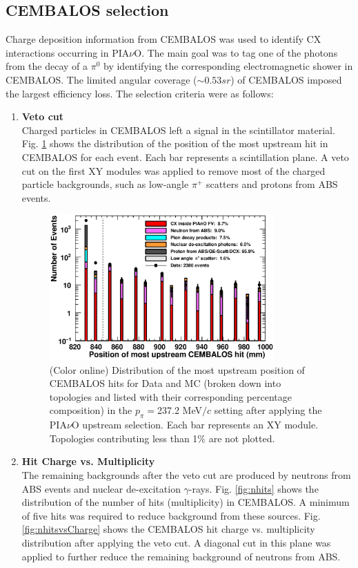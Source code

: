 \subsection{CEMBALOS selection}
Charge deposition information from CEMBALOS was used to identify CX interactions occurring in PIA$\nu$O. The main goal was to tag one of the photons from the decay of a $\pi^0$ by identifying the corresponding electromagnetic shower in CEMBALOS. The limited angular coverage ($\sim0.53 sr$) of CEMBALOS imposed the largest efficiency loss. The selection criteria were as follows:
\begin{enumerate}
\item{\bf Veto cut\\}
Charged particles in CEMBALOS left a signal in the scintillator material. Fig. \ref{fig:veto} shows the distribution of the position of the most upstream hit in CEMBALOS for each event. Each bar represents a scintillation plane. A veto cut on the first XY modules was applied to remove most of the charged particle backgrounds, such as low-angle $\pi^+$ scatters and protons from ABS events.

\begin{figure}[ht]
 \includegraphics[width=86mm]{figures/duettag_fgdMostUp_10000_forpaper_v4.eps}
 \caption{(Color online) Distribution of the most upstream position of CEMBALOS hits for Data and MC (broken down into topologies and listed with their corresponding percentage composition) in the $p_\pi=$237.2 MeV$/c$ setting after applying the PIA$\nu$O upstream selection. Each bar represents an XY module. Topologies contributing less than 1\% are not plotted.}
 \label{fig:veto}
\end{figure}
   
\item{\bf Hit Charge vs. Multiplicity\\}
The remaining backgrounds after the veto cut are produced by neutrons from ABS events and nuclear de-excitation $\gamma$-rays. Fig. \ref{fig:nhits} shows the distribution of the number of hits (multiplicity) in CEMBALOS. A minimum of five hits was required to reduce background from these sources. Fig. \ref{fig:nhitsvsCharge} shows the CEMBALOS hit charge vs. multiplicity distribution after applying the veto cut. A diagonal cut in this plane was applied to further reduce the remaining background of neutrons from ABS.
\end{enumerate}

